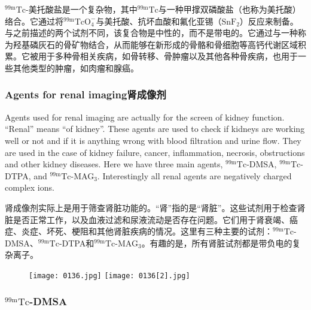 \documentclass[dvipsnames, svgnames,a4paper,11pt]{article}
\begin{document}
 ${}^\mathrm{99m}\mathrm{Tc}$-美托酸盐是一个复杂物，其中${}^\mathrm{99m}\mathrm{Tc}$与一种甲撑双磷酸盐（也称为美托酸）络合。它通过将${}^\mathrm{99m}\mathrm{TcO_4^-}$与美托酸、抗坏血酸和氟化亚锡（Sn$\mathrm{F}_2$）反应来制备。与之前描述的两个试剂不同，该复合物是中性的，而不是带电的。它通过与一种称为羟基磷灰石的骨矿物结合，从而能够在新形成的骨骼和骨细胞等高钙代谢区域积累。它被用于多种骨相关疾病，如骨转移、骨肿瘤以及其他各种骨疾病，也用于一些其他类型的肿瘤，如肉瘤和腺癌。



\subsubsection{Agents for renal imaging肾成像剂}

Agents used for renal imaging are actually for the screen of kidney function. “Renal”
means “of kidney”. These agents are used to check if kidneys are working well or not
and if it is anything wrong with blood filtration and urine flow. They are used in the
case of kidney failure, cancer, inflammation, necrosis, obstructions and other kidney
diseases. Here we have three main agents, ${}^\mathrm{99m}\mathrm{Tc}$-DMSA, ${}^\mathrm{99m}\mathrm{Tc}$-DTPA, and ${}^\mathrm{99m}\mathrm{Tc}$-MAG${}_3$. Interestingly all renal agents are negatively charged complex ions.

肾成像剂实际上是用于筛查肾脏功能的。“肾”指的是“肾脏”。这些试剂用于检查肾脏是否正常工作，以及血液过滤和尿液流动是否存在问题。它们用于肾衰竭、癌症、炎症、坏死、梗阻和其他肾脏疾病的情况。这里有三种主要的试剂：${}^\mathrm{99m}\mathrm{Tc}$-DMSA、${}^\mathrm{99m}\mathrm{Tc}$-DTPA和${}^\mathrm{99m}\mathrm{Tc}$-MAG${}_3$。有趣的是，所有肾脏试剂都是带负电的复杂离子。

\begin{figure}[h]
	\centering
    \texttt{[image: 0136.jpg]}    
    \hspace{0.1in}
    \texttt{[image: 0136[2].jpg]} 
     \label{fig139}
\end{figure}

\subsubsection{${}^\mathrm{99m}\mathrm{Tc}$-DMSA}
\end{document}
